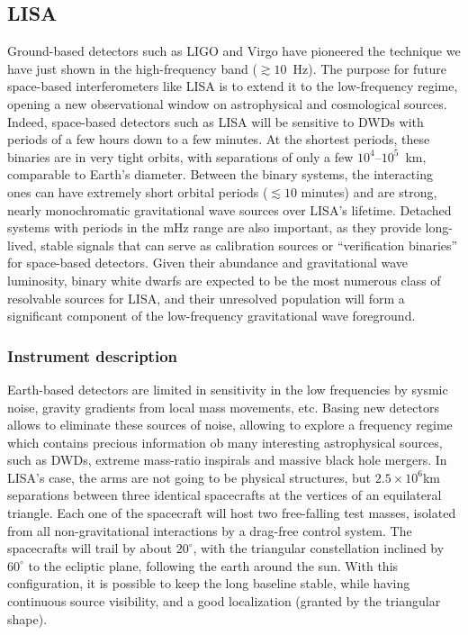 \subsection{LISA}
Ground-based detectors such as LIGO and Virgo have pioneered the technique we have just shown in the high-frequency band ($\gtrsim 10$~Hz).
The purpose for future space-based interferometers like LISA is to extend it to the low-frequency regime, opening a new observational window on astrophysical and cosmological sources.
Indeed, space-based detectors such as LISA will be sensitive to DWDs with periods of a few hours down to a few minutes.  
At the shortest periods, these binaries are in very tight orbits, with separations of only a few $10^{4}$–$10^{5}$~km, comparable to Earth's diameter.
Between the binary systems, the interacting ones can have extremely short orbital periods ($\lesssim 10$ minutes) and are strong, nearly monochromatic gravitational wave sources over LISA's lifetime.  
Detached systems with periods in the mHz range are also important, as they provide long-lived, stable signals that can serve as calibration sources or ``verification binaries'' for space-based detectors.
Given their abundance and gravitational wave luminosity, binary white dwarfs are expected to be the most numerous class of resolvable sources for LISA, and their unresolved population will form a significant component of the low-frequency gravitational wave foreground.

\subsubsection{Instrument description}
Earth-based detectors are limited in sensitivity in the low frequencies by sysmic noise, gravity gradients from local mass movements, etc.
Basing new detectors allows to eliminate these sources of noise, allowing to explore a frequency regime which contains precious information ob many interesting astrophysical sources, such as DWDs, extreme mass-ratio inspirals and massive black hole mergers.
In LISA's case, the arms are not going to be physical structures, but $2.5\times10^6$km separations between three identical spacecrafts at the vertices of an equilateral triangle.
Each one of the spacecraft will host two free-falling test masses, isolated from all non-gravitational interactions by a drag-free control system.
The spacecrafts will trail by about $20^{\circ}$, with the triangular constellation inclined by $60^{\circ}$ to the ecliptic plane, following the earth around the sun.
With this configuration, it is possible to keep the long baseline stable, while having continuous source visibility, and a good localization (granted by the triangular shape).

